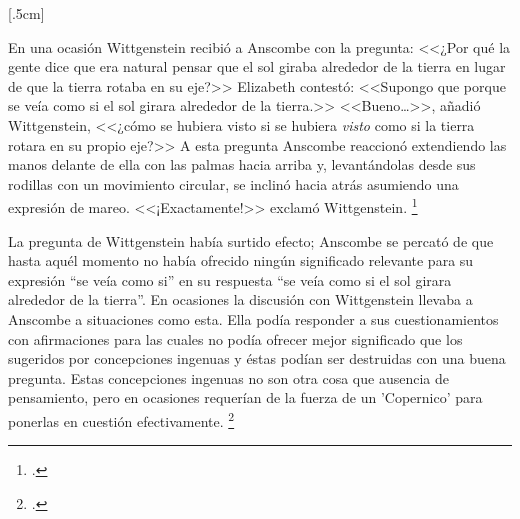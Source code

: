 \documentclass[../main.tex]{subfiles}
\begin{document}




[.5cm]


En una ocasión Wittgenstein recibió a Anscombe con la pregunta: <<¿Por qué la gente dice que era natural pensar que el sol giraba alrededor de la tierra en lugar de que la tierra rotaba en su eje?>> Elizabeth contestó: <<Supongo que porque se veía como si el sol girara alrededor de la tierra.>> <<Bueno\ldots>>, añadió Wittgenstein, <<¿cómo se hubiera visto si se hubiera \emph{visto} como si la tierra rotara en su propio eje?>> A esta pregunta Anscombe reaccionó extendiendo las manos delante de ella con las palmas hacia arriba y, levantándolas desde sus rodillas con un movimiento circular, se inclinó hacia atrás asumiendo una expresión de mareo. <<¡Exactamente!>> exclamó Wittgenstein. \footcite[151]{IWT}


La pregunta de Wittgenstein había surtido efecto; Anscombe se percató de que hasta aquél momento no había ofrecido ningún significado relevante para su expresión ``se veía como si'' en su respuesta ``se veía como si el sol girara alrededor de la tierra''. En ocasiones la discusión con Wittgenstein llevaba a Anscombe a situaciones como esta. Ella podía responder a sus cuestionamientos con afirmaciones para las cuales no podía ofrecer mejor significado que los sugeridos por concepciones ingenuas y éstas podían ser destruidas con una buena pregunta. Estas concepciones ingenuas no son otra cosa que ausencia de pensamiento, pero en ocasiones requerían de la fuerza de un 'Copernico' para ponerlas en cuestión efectivamente.  \footcite[cf. 151]{IWT}


\end{document}
